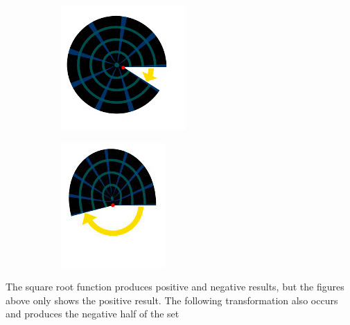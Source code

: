 \documentclass[12pt]{article}
\begin{document}
\begin{figure}[H]
	\centering
	\begin{subfigure}{.5\textwidth}
		\centering
		\includegraphics[width=.4\linewidth]{images/julia2}
		\label{fig:sub1}
	\end{subfigure}%
	\begin{subfigure}{.5\textwidth}
		\centering
		\includegraphics[width=.4\linewidth]{images/julia3}
		\label{fig:sub2}
	\end{subfigure}
	\label{fig:test}
\end{figure}
The square root function produces positive and negative results, but the figures above only shows the positive result. The following transformation also occurs and produces the negative half of the set
\end{document}
